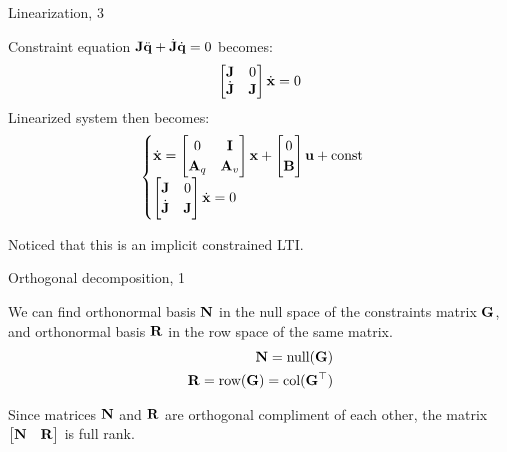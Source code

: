 \documentclass{beamer}
\begin{document}
\begin{frame}{Linearization, 3}
	\begin{flushleft}
		
		Constraint equation $\mathbf{J} \ddot{\mathbf{q}} + \dot{\mathbf{J}} \dot{\mathbf{q}}= 0$ becomes:
		\begin{align}
			\begin{bmatrix}
				\mathbf{J}  & 0 \\
				\dot{\mathbf{J}} & \mathbf{J}
			\end{bmatrix}
		\dot{\mathbf{x}}
		= 0
		\end{align}
		Linearized system then becomes:
			\begin{align}
				\begin{cases}
					\dot{\mathbf{x}} = 
					\begin{bmatrix}
						0 & \mathbf{I} \\
						\mathbf{A}_q & \mathbf{A}_v
					\end{bmatrix}
					\mathbf{x}
					+
					\begin{bmatrix}
						0 \\
						\mathbf{B}
					\end{bmatrix}
					\mathbf{u}
					+
					\text{const}
					\\
					\begin{bmatrix}
						\mathbf{J}  & 0 \\
						\dot{\mathbf{J}} & \mathbf{J}
					\end{bmatrix}
					\dot{\mathbf{x}}
					= 0
				\end{cases}
		\end{align}
	
	Noticed that this is an implicit constrained LTI.
		
	\end{flushleft}
\end{frame}




\begin{frame}{Orthogonal decomposition, 1}
	\begin{flushleft}
		
		We can find orthonormal basis $\mathbf{N}$ in the null space of the constraints matrix $\mathbf{G}$, and orthonormal basis $\mathbf{R}$ in the row space of the same matrix.
			\begin{align}
				\mathbf{N} = \text{null}(\mathbf{G}) \\
				\mathbf{R} = \text{row}(\mathbf{G}) = \text{col}(\mathbf{G}^\top)
			\end{align}
		
		Since matrices $\mathbf{N}$ and $\mathbf{R}$ are orthogonal compliment of each other, the matrix $\begin{bmatrix}
			\mathbf{N} & \mathbf{R}
		\end{bmatrix}$ is full rank.
		
		
	\end{flushleft}
\end{frame}
\end{document}
